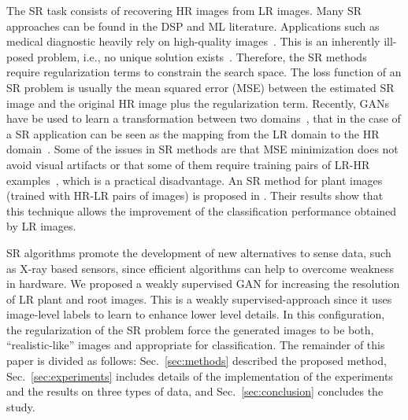 \documentclass[10pt,twocolumn,letterpaper]{article}
\begin{document}
The SR task consists of recovering HR images from LR images. Many SR approaches can be found in the DSP and ML literature. Applications such as medical diagnostic heavily rely on high-quality images~\cite{Zhang2012}. This is an inherently ill-posed problem, i.e., no unique solution exists~\cite{Hui2018}. Therefore, the SR methods require regularization terms to constrain the search space. The loss function of an SR problem is usually the mean squared error (MSE) between the estimated SR image and the original HR image plus the regularization term. Recently, GANs have be used to learn a transformation between two domains~\cite{Hong2018}, that in the case of a SR application can be seen as the mapping from the LR domain to the HR domain~\cite{Ledig2017}. Some of the issues in SR methods are that MSE minimization does not avoid visual artifacts or that some of them require training pairs of LR-HR examples~\cite{Zeyde2012}, which is a practical disadvantage. An SR method for plant images (trained with HR-LR pairs of images) is proposed in \cite{Yamamoto2017}. Their results show that this technique allows the improvement of the classification performance obtained by LR images.


SR algorithms promote the development of new alternatives to sense data, such as X-ray based sensors, since efficient algorithms can help to overcome weakness in hardware. We proposed a weakly supervised GAN for increasing the resolution of LR plant and root images. This is a weakly supervised-approach since it uses image-level labels to learn to enhance lower level details. In this configuration, the regularization of the SR problem force the generated images to be both, ``realistic-like'' images and appropriate for classification. The remainder of this paper is divided as follows: Sec.~\ref{sec:methods} described the proposed method, Sec.~\ref{sec:experiments} includes details of the implementation of the experiments and the results on three types of data, and Sec.~\ref{sec:conclusion} concludes the study.

\end{document}
